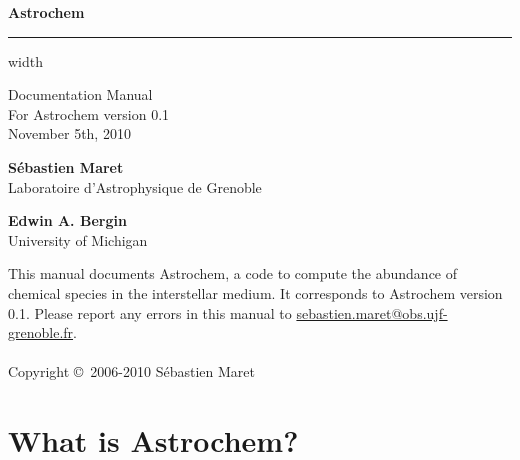 \documentclass[a4paper,12pt]{article}
\makeatletter
\newcommand{\version}{0.1}
\newcommand{\updated}{November 5th, 2010}
\newcommand{\bugreport}{\url{sebastien.maret@obs.ujf-grenoble.fr}}
\makeatother
\begin{document}
\VerbatimFootnotes

\thispagestyle{empty}
\vspace*{5cm}

\noindent
\huge{\textbf{Astrochem}}

\begin{latexonly}
  \vskip4pt \hrule height 4pt width \hsize
\end{latexonly}

\begin{flushright}
  \noindent
  \small{
    Documentation Manual\\
    For Astrochem version \version\\
    \updated
  }
\end{flushright}

\noindent
\large{\textbf{S\'ebastien Maret}\\
\small{Laboratoire d'Astrophysique de Grenoble\\}

\noindent
\large{\textbf{Edwin A. Bergin}}\\
\small{University of Michigan}\\

\newpage
\vspace*{20cm}

\small{
  \noindent This manual documents Astrochem, a code to compute the
  abundance of chemical species in the interstellar medium. It
  corresponds to Astrochem version \version.
  Please report any errors in this manual to \bugreport.
  \\ \\ \noindent Copyright \copyright \, 2006-2010 S\'ebastien
  Maret
}

\section{What is Astrochem?}
\label{sec:what-astrochem}

}
\end{document}
